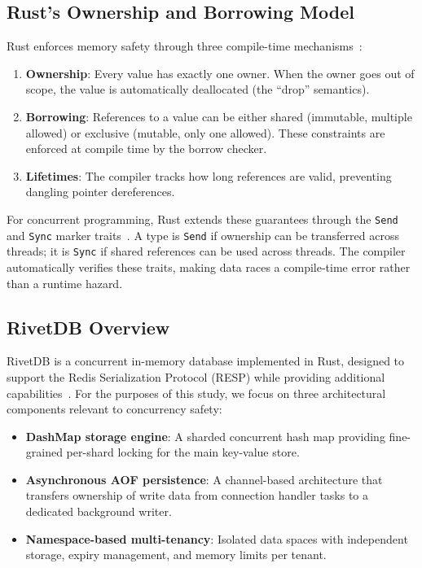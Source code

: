 \documentclass[conference,a4paper]{IEEEtran}
\begin{document}
\subsection{Rust's Ownership and Borrowing Model}

Rust enforces memory safety through three compile-time mechanisms~\cite{matsakis2014, klabnik2023}:

\begin{enumerate}
    \item \textbf{Ownership}: Every value has exactly one owner. When the owner goes out of scope, the value is automatically deallocated (the ``drop'' semantics).
    \item \textbf{Borrowing}: References to a value can be either shared (immutable, multiple allowed) or exclusive (mutable, only one allowed). These constraints are enforced at compile time by the borrow checker.
    \item \textbf{Lifetimes}: The compiler tracks how long references are valid, preventing dangling pointer dereferences.
\end{enumerate}

For concurrent programming, Rust extends these guarantees through the \texttt{Send} and \texttt{Sync} marker traits~\cite{jung2021rustbelt}. A type is \texttt{Send} if ownership can be transferred across threads; it is \texttt{Sync} if shared references can be used across threads. The compiler automatically verifies these traits, making data races a compile-time error rather than a runtime hazard.

\subsection{RivetDB Overview}

RivetDB is a concurrent in-memory database implemented in Rust, designed to support the Redis Serialization Protocol (RESP) while providing additional capabilities~\cite{shimpi2026rivetdb}. For the purposes of this study, we focus on three architectural components relevant to concurrency safety:

\begin{itemize}
    \item \textbf{DashMap storage engine}: A sharded concurrent hash map providing fine-grained per-shard locking for the main key-value store.
    \item \textbf{Asynchronous AOF persistence}: A channel-based architecture that transfers ownership of write data from connection handler tasks to a dedicated background writer.
    \item \textbf{Namespace-based multi-tenancy}: Isolated data spaces with independent storage, expiry management, and memory limits per tenant.
\end{itemize}
\end{document}
